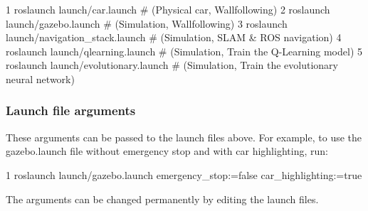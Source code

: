 \begin{DoxyCode}
1 roslaunch launch/car.launch # (Physical car, Wallfollowing)
2 roslaunch launch/gazebo.launch # (Simulation, Wallfollowing)
3 roslaunch launch/navigation\_stack.launch # (Simulation, SLAM & ROS navigation)
4 roslaunch launch/qlearning.launch # (Simulation, Train the Q-Learning model)
5 roslaunch launch/evolutionary.launch # (Simulation, Train the evolutionary neural network)
\end{DoxyCode}


\subsubsection*{Launch file arguments}

These arguments can be passed to the launch files above. For example, to use the {\ttfamily gazebo.\+launch} file without emergency stop and with car highlighting, run\+: 
\begin{DoxyCode}
1 roslaunch launch/gazebo.launch emergency\_stop:=false car\_highlighting:=true
\end{DoxyCode}
 The arguments can be changed permanently by editing the launch files.

